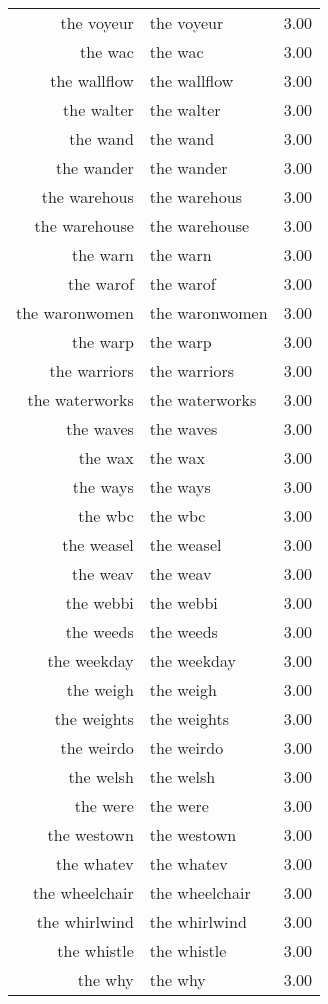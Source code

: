 \begin{table}[ht]
\begin{tabular}{rlr}
  the voyeur & the voyeur & 3.00 \\ 
  the wac & the wac & 3.00 \\ 
  the wallflow & the wallflow & 3.00 \\ 
  the walter & the walter & 3.00 \\ 
  the wand & the wand & 3.00 \\ 
  the wander & the wander & 3.00 \\ 
  the warehous & the warehous & 3.00 \\ 
  the warehouse & the warehouse & 3.00 \\ 
  the warn & the warn & 3.00 \\ 
  the warof & the warof & 3.00 \\ 
  the waronwomen & the waronwomen & 3.00 \\ 
  the warp & the warp & 3.00 \\ 
  the warriors & the warriors & 3.00 \\ 
  the waterworks & the waterworks & 3.00 \\ 
  the waves & the waves & 3.00 \\ 
  the wax & the wax & 3.00 \\ 
  the ways & the ways & 3.00 \\ 
  the wbc & the wbc & 3.00 \\ 
  the weasel & the weasel & 3.00 \\ 
  the weav & the weav & 3.00 \\ 
  the webbi & the webbi & 3.00 \\ 
  the weeds & the weeds & 3.00 \\ 
  the weekday & the weekday & 3.00 \\ 
  the weigh & the weigh & 3.00 \\ 
  the weights & the weights & 3.00 \\ 
  the weirdo & the weirdo & 3.00 \\ 
  the welsh & the welsh & 3.00 \\ 
  the were & the were & 3.00 \\ 
  the westown & the westown & 3.00 \\ 
  the whatev & the whatev & 3.00 \\ 
  the wheelchair & the wheelchair & 3.00 \\ 
  the whirlwind & the whirlwind & 3.00 \\ 
  the whistle & the whistle & 3.00 \\ 
  the why & the why & 3.00 \\ 

\end{tabular}
\end{table}
